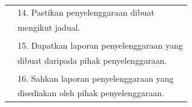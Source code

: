 \documentclass[
]{article}
\begin{document}
\begin{longtable}[]{@{}ll@{}}
\begin{minipage}[t]{0.23\columnwidth}
\strut
\end{minipage} & \begin{minipage}[t]{0.71\columnwidth}\raggedright
14. Pastikan penyelenggaraan dibuat\strut
\end{minipage}\tabularnewline
\begin{minipage}[t]{0.23\columnwidth}\raggedright
\strut
\end{minipage} & \begin{minipage}[t]{0.71\columnwidth}\raggedright
mengikut jadual.\strut
\end{minipage}\tabularnewline
\begin{minipage}[t]{0.23\columnwidth}\raggedright
\strut
\end{minipage} & \begin{minipage}[t]{0.71\columnwidth}\raggedright
\strut
\end{minipage}\tabularnewline
\begin{minipage}[t]{0.23\columnwidth}\raggedright
\strut
\end{minipage} & \begin{minipage}[t]{0.71\columnwidth}\raggedright
15. Dapatkan laporan penyelenggaraan yang\strut
\end{minipage}\tabularnewline
\begin{minipage}[t]{0.23\columnwidth}\raggedright
\strut
\end{minipage} & \begin{minipage}[t]{0.71\columnwidth}\raggedright
dibuat daripada pihak penyelenggaraan.\strut
\end{minipage}\tabularnewline
\begin{minipage}[t]{0.23\columnwidth}\raggedright
\strut
\end{minipage} & \begin{minipage}[t]{0.71\columnwidth}\raggedright
\strut
\end{minipage}\tabularnewline
\begin{minipage}[t]{0.23\columnwidth}\raggedright
\strut
\end{minipage} & \begin{minipage}[t]{0.71\columnwidth}\raggedright
16. Sahkan laporan penyelenggaraan yang\strut
\end{minipage}\tabularnewline
\begin{minipage}[t]{0.23\columnwidth}\raggedright
\strut
\end{minipage} & \begin{minipage}[t]{0.71\columnwidth}\raggedright
disediakan oleh pihak penyelenggaraan.\strut

\end{minipage}
\end{longtable}
\end{document}
